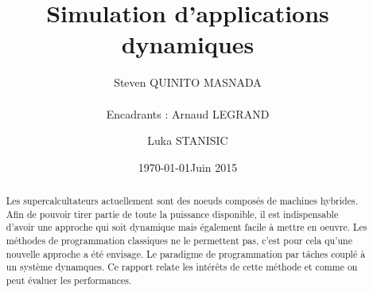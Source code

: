 \documentclass[smallextended]{svjour3}
\date{\today}
\title{}
\begin{document}
\newcommand{\AL}[2][inline]{\todo[color=green!50,#1]{\sf \textbf{AL:} #2}\xspace}
\newcommand{\LS}[2][inline]{\todo[color=green!50,#1]{\sf \textbf{LS:} #2}\xspace}

\let\oldcite=\cite
\renewcommand\cite[2][]{~\ifthenelse{\equal{#1}{}}{\oldcite{#2}}{\oldcite[#1]{#2}}\xspace}
\let\oldref=\ref
\def\ref#1{~\oldref{#1}\xspace}
\def\ie{i.e.,\xspace}
\def\eg{e.g.,\xspace}
\def\qrmspu{\texttt{QRM\_StarPU}\xspace}
\sloppy

\title{Simulation d'applications dynamiques%
}


\author{Steven QUINITO MASNADA  \\ \\
        Encadrants : Arnaud LEGRAND \and Luka STANISIC  %
}


\institute{%
}

\date{Juin 2015}

\maketitle


\begin{abstract}

Les supercalcultateurs actuellement sont des noeuds composés de
machines hybrides. Afin de pouvoir tirer partie de toute la
puissance disponible, il est indispensable d'avoir une approche qui
soit dynamique mais également facile à mettre en oeuvre. Les méthodes
de programmation classiques ne le permettent pas, c'est pour cela
qu'une nouvelle approche a été envisage. Le paradigme de
programmation par tâches couplé à un système dynamques. Ce rapport
relate les intérêts de cette méthode et comme on peut évaluer les
performances. 
\newpage
\end{abstract}
\end{document}
